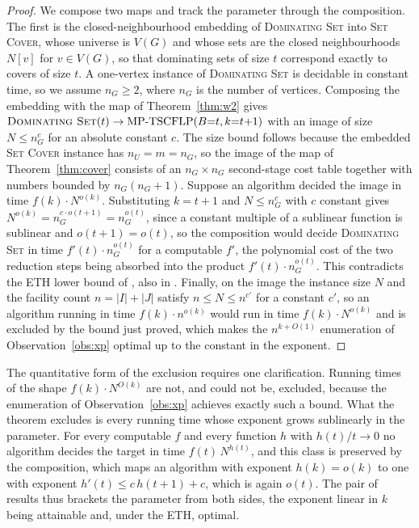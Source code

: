 \begin{proof}
We compose two maps and track the parameter through the composition.
The first is the closed-neighbourhood embedding of
\textsc{Dominating Set} into \textsc{Set Cover}, whose universe is
$V(G)$ and whose sets are the closed neighbourhoods $N[v]$ for
$v\in V(G)$, so that dominating sets of size $t$ correspond exactly to
covers of size $t$. A one-vertex instance of \textsc{Dominating Set} is
decidable in constant time, so we assume $n_G\ge 2$, where $n_G$ is the
number of vertices. Composing the embedding with the map of
Theorem~\ref{thm:w2} gives
$\textsc{Dominating Set}(t)\to\mathrm{MP\text{-}TSCFLP}(B{=}t,k{=}t{+}1)$
with an image of size $N\le n_G^{c}$ for an absolute constant
$c$. The size bound follows because the
embedded \textsc{Set Cover} instance has $n_U=m=n_G$, so the image of
the map of Theorem~\ref{thm:cover} consists of an $n_G\times n_G$
second-stage cost table together with numbers bounded by $n_G(n_G+1)$.
Suppose an algorithm decided the image in
time $f(k)\cdot N^{o(k)}$. Substituting $k=t+1$ and $N\le n_G^{c}$ with $c$
constant gives $N^{o(k)}=n_G^{c\cdot o(t+1)}=n_G^{o(t)}$, since a constant
multiple of a sublinear function is sublinear and $o(t+1)=o(t)$, so the
composition would decide \textsc{Dominating Set} in time $f'(t)\cdot
n_G^{o(t)}$ for a computable $f'$, the polynomial cost of the two
reduction steps being absorbed into the product $f'(t)\cdot n_G^{o(t)}$.
This contradicts the ETH lower bound of
\citet{ChenHuangKanjXia2006}, also in \citet[Chapter~14]{Cygan2015}.
Finally, on the image the instance size $N$ and the
facility count $n=|I|+|J|$ satisfy $n\le N\le n^{c'}$ for a constant
$c'$, so an algorithm running in time $f(k)\cdot n^{o(k)}$ would run in
time $f(k)\cdot N^{o(k)}$ and is excluded by the bound just proved,
which makes the $n^{k+O(1)}$ enumeration of Observation~\ref{obs:xp}
optimal up to the constant in the exponent.
\end{proof}

The quantitative form of the exclusion requires one clarification.
Running times of the shape $f(k)\cdot N^{O(k)}$
are not, and could not be, excluded, because the enumeration of
Observation~\ref{obs:xp} achieves exactly such a bound. What the
theorem excludes is every running time whose exponent grows sublinearly
in the parameter. For every computable $f$ and
every function $h$ with $h(t)/t\to 0$ no algorithm decides the target in
time $f(t)\,N^{h(t)}$, and this class is preserved by the composition,
which maps an algorithm with
exponent $h(k)=o(k)$ to one with exponent $h'(t)\le c\,h(t+1)+c$, which
is again $o(t)$. The pair of results thus brackets the parameter from
both sides, the exponent
linear in $k$ being attainable and, under the ETH, optimal.

